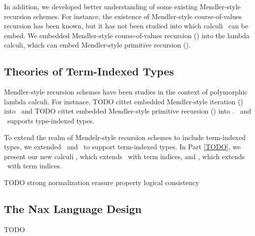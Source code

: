 In addition, we developed better understanding of some existing Mendler-style
recursion schemes. For instance, the existence of Mendler-style course-of-values
recursion has been known, but it has not been studied into which calculi
\McvPr\ can be embed. We embedded Mendler-style course-of-values recursion
(\McvPr) into the lambda calculi, which can embed Mendler-style primitive
recursion (\MPr).


\subsection{Theories of Term-Indexed Types}
Mendler-style recursion schemes have been studies in the context of
polymorphic lambda calculi. For instnace, {TODO cittet} embedded 
Mendler-style iteration (\MIt) into \Fw\ and {TODO cittet} embedded
Mendler-style primitive recursion (\MPr) into \Fixw.
\Fw\ and \Fixw\ supports type-indexed types.

To extend the realm of Mendelr-style recursion schemes to include
term-indexed types, we extended \Fw\ and \Fixw\ to support term-indexed types.
In Part \ref{TODO}, we present our new calculi
\Fi, which extends \Fw\ with term indices, and
\Fixi, which extends \Fixw\ with term indices.

TODO strong normalization
erasure property
logical consistency

\subsection{The Nax Language Design}
TODO

